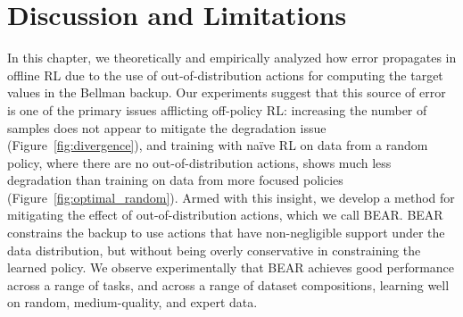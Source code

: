 \section{Discussion and Limitations}
\vspace{-5pt}

In this chapter, we theoretically and empirically analyzed how error propagates in offline RL due to the use of out-of-distribution actions for computing the target values in the Bellman backup. Our experiments suggest that this source of error is one of the primary issues afflicting off-policy RL: increasing the number of samples does not appear to mitigate the degradation issue (Figure~\ref{fig:divergence}), and training with na\"{i}ve RL on data from a random policy, where there are no out-of-distribution actions, shows much less degradation than training on data from more focused policies (Figure~\ref{fig:optimal_random}). Armed with this insight, we develop a method for mitigating the effect of out-of-distribution actions, which we call BEAR. BEAR constrains the backup to use actions that have non-negligible support under the data distribution, but without being overly conservative in constraining the learned policy. We observe experimentally that BEAR achieves good performance across a range of tasks, and across a range of dataset compositions, learning well on random, medium-quality, and expert data.

